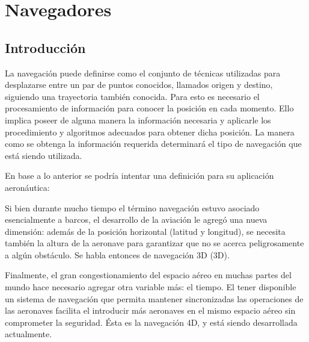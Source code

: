 %



\chapter{Navegadores}
\label{chap:U08.navegadores}

\section{Introducci\'on}
\label{sec:U08.introduccion}


La navegaci\'on puede definirse como el conjunto de t\'ecnicas utilizadas para desplazarse entre un par de puntos conocidos, llamados origen y destino, siguiendo una \gls{trayectoria} tambi\'en conocida. Para esto es necesario el procesamiento de informaci\'on para conocer la posici\'on en cada momento. Ello implica poseer de alguna manera la informaci\'on necesaria y aplicarle los procedimiento y algoritmos adecuados para obtener dicha posici\'on. La manera como se obtenga la informaci\'on requerida determinar\'a el tipo de navegaci\'on que est\'a siendo utilizada.

En base a lo anterior se podr\'ia intentar una definici\'on para su aplicaci\'on aeron\'autica:



Si bien durante mucho tiempo el t\'ermino navegaci\'on estuvo asociado esencialmente a barcos, el desarrollo de la aviaci\'on le agreg\'o una nueva dimensi\'on: adem\'as de la posici\'on horizontal (\Gls{latitud} y \Gls{longitud}), se necesita tambi\'en la altura de la aeronave para garantizar que no se acerca peligrosamente a alg\'un obst\'aculo. Se habla entonces de navegaci\'on 3D (\ac{3D}).

Finalmente, el gran congestionamiento del espacio a\'ereo en muchas partes del mundo hace necesario agregar otra variable m\'as: el tiempo. El tener disponible un sistema de navegaci\'on que permita mantener sincronizadas las operaciones de las aeronaves facilita el introducir m\'as aeronaves en el mismo espacio a\'ereo sin comprometer la seguridad. \'Esta es la navegaci\'on 4D, y est\'a siendo desarrollada actualmente.


